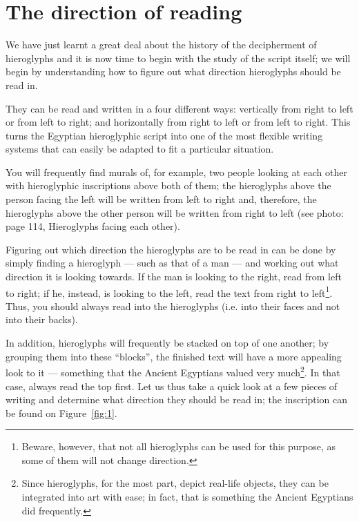 \documentclass[a5paper,twoside,11pt]{report}
\begin{document}
\chapter*{The direction of reading}

		We have just learnt a great deal about the history of the decipherment of hieroglyphs and it is now time to begin with the study of the script itself; we will begin by understanding how to figure out what direction hieroglyphs should be read in. 

		They can be read and written in a four different ways: vertically from right to left or from left to right; and horizontally from right to left or from left to right. This turns the Egyptian hieroglyphic script into one of the most flexible writing systems that can easily be adapted to fit a particular situation. 

		You will frequently find murals of, for example, two people looking at each other with hieroglyphic inscriptions above both of them; the hieroglyphs above the person facing the left will be written from left to right and, therefore, the hieroglyphs above the other person will be written from right to left (see photo: page 114, Hieroglyphs facing each other).

		Figuring out which direction the hieroglyphs are to be read in can be done by simply finding a hieroglyph — such as that of a man — and working out what direction it is looking towards. If the man is looking to the right, read from left to right; if he, instead, is looking to the left, read the text from right to left\footnote{Beware, however, that not all hieroglyphs can be used for this purpose, as some of them will not change direction.}. Thus, you should always read into the hieroglyphs (i.e. into their faces and not into their backs). 

		In addition, hieroglyphs will frequently be stacked on top of one another; by grouping them into these “blocks”, the finished text will have a more appealing look to it — something that the Ancient Egyptians valued very much\footnote{Since hieroglyphs, for the most part, depict real-life objects, they can be integrated into art with ease; in fact, that is something the Ancient Egyptians did frequently.}. In that case, always read the top first. 
		Let us thus take a quick look at a few pieces of writing and determine what direction they should be read in; the inscription can be found on Figure~\ref{fig:1}.
\end{document}
